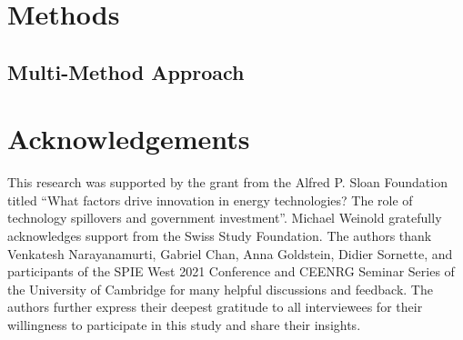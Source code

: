 \documentclass[parskip=full]{article}
\begin{document}
\section{Methods}

\subsection{Multi-Method Approach}



\section{Acknowledgements}

This research was supported by the grant from the Alfred P. Sloan Foundation titled “What factors drive innovation in energy technologies? The role of technology spillovers and government investment”. Michael Weinold gratefully acknowledges support from the Swiss Study Foundation. The authors thank Venkatesh Narayanamurti, Gabriel Chan, Anna Goldstein, Didier Sornette, and participants of the SPIE West 2021 Conference and CEENRG Seminar Series of the University of Cambridge for many helpful discussions and feedback. The authors further express their deepest gratitude to all interviewees for their willingness to participate in this study and share their insights.

\newpage
\printbibliography
\end{document}
